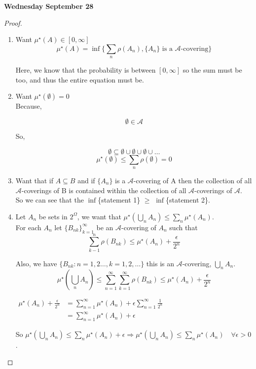 \documentclass[11pt,fleqn]{book} %
\begin{document}
\textbf{Wednesday September 28}\\


\begin{proof}
	\begin{enumerate}
		\item Want $\mu^\star (A) \in [0, \infty ]$\\

			$$\mu^\star(A) = \inf \{\displaystyle \sum _n \rho(A_n), \{A_n\} \text{ is a } \mathcal{A} \text{-covering} \} $$ 

			Here, we know that the probability is between $[0,\infty]$ so the sum must be too, and thus the entire equation must be. 

		\item Want $\mu^\star (\emptyset) = 0$\\

			Because, 

					$$\emptyset \in \mathcal{A}$$

			So, 

					$$\emptyset \subseteq \emptyset \cup \emptyset \cup \emptyset \cup \dots $$
					$$\mu^\star (\emptyset) \leq \sum_n \rho(\emptyset) = 0  $$


		\item Want that if $A \subseteq B$ and if $\{A_n \}$ is a $\mathcal{A}$-covering of A then the collection of all $\mathcal{A}$-coverings of B is contained within the collection of all $\mathcal{A}$-coverings of $\mathcal{A}$.\\

		So we can see that the $\inf$\{statement 1\} $\geq$ $\inf$\{statement 2\}.\\

		\item Let $A_n$ be sets in $2^\Omega$, we want that $\mu^\star(\bigcup_n A_n) \leq \sum_n \mu^\star(A_n)$.\\

		For each $A_n$ let $\{B_{nk}\}^\infty_{k=1}$ be an $\mathcal{A}$-covering of $A_n$
 such that 
 				$$\sum^n_{k-1} \rho (B_{nk}) \leq \mu^\star (A_n) + \frac{\epsilon }{2^n} $$

 		Also, we have $\{B_{nk} : n = 1, 2 \dots, k = 1, 2, \dots \}$ this is an $\mathcal{A}$-covering, $\bigcup_n A_n$.\\

 				$$\mu^\star(\bigcup_n A_n) \leq \displaystyle \sum^\infty_{n = 1} \displaystyle \sum^\infty_{k = 1} \rho (B_{nk})  \leq \mu^\star(A_n) + \frac{\epsilon }{2^n}  $$


 				$\begin{aligned}
 					\mu^\star(A_n) + \frac{\epsilon }{2^n} & = \sum^\infty_{n=1}\mu^\star(A_n) + \epsilon \sum^\infty_{n=1}\frac{1 }{2^n} \\
 						&= \sum^\infty_{n=1}\mu^\star(A_n) + \epsilon
 				\end{aligned}$		

 				So  $\mu^\star(\bigcup_n A_n) \leq \sum_n \mu^\star(A_n) + \epsilon \Rightarrow \mu^\star(\bigcup_n A_n) \leq \sum_n \mu^\star(A_n) \quad \forall \epsilon > 0$.
 	\end{enumerate}
\end{proof}
\end{document}
